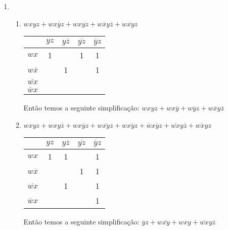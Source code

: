 \documentclass{article}
\begin{document}
\begin{enumerate}
	\item
	      \begin{enumerate}

		      \item \( wxyz + wx \overline{y} z + wx \overline{yz} + w \overline{x} y \overline{z} + w \overline{xy} z \)

		            \begin{tabular}{c | c | c | c | c|}
			            \(   \)              & \( yz \) & \( y \overline{z} \) & \( \overline{yz} \) & \( \overline{y} z\) \\ [0.5ex]
			            \hline
			            \( wx \)             & 1        &                      & 1                   & 1                   \\
			            \hline
			            \( w \overline{x} \) &          & 1                    &                     & 1                   \\
			            \hline
			            \( \overline{wx} \)  &          &                      &                     &                     \\
			            \hline
			            \( \overline{w} x \) &          &                      &                     &                     \\
			            \hline
		            \end{tabular}

		            Então temos a seguinte simplificação: \( wxyz + wx \overline{y} + w \overline{y} z + w \overline{x} y \overline{z} \)

		      \item \( wxyz + wxy \overline{z} + wx \overline{y} z + w \overline{xy} z + w \overline{xyz} + \overline{w} x \overline{y} z + \overline{wx} y \overline{z} + \overline{wxy} z\)

		            \begin{tabular}{c | c | c | c | c|}
			            \(   \)              & \( yz \) & \( y \overline{z} \) & \( \overline{yz} \) & \( \overline{y} z\) \\ [0.5ex]
			            \hline
			            \( wx \)             & 1        & 1                    &                     & 1                   \\
			            \hline
			            \( w \overline{x} \) &          &                      & 1                   & 1                   \\
			            \hline
			            \( \overline{wx} \)  &          & 1                    &                     & 1                   \\
			            \hline
			            \( \overline{w} x \) &          &                      &                     & 1                   \\
			            \hline
		            \end{tabular}

		            Então temos a seguinte simplificação: \( \overline{y} z + w \overline{xy} + w xy + \overline{wx} y \overline{z} \)
	      \end{enumerate}

\end{enumerate}
\end{document}
